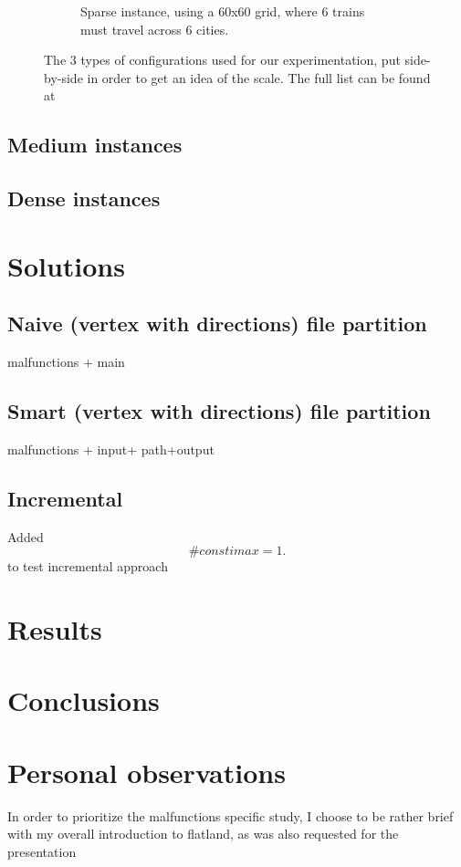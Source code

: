 \documentclass[runningheads]{llncs}
\begin{document}
\begin{figure}
\begin{minipage}{.49\textwidth}
\begin{subfigure}{\textwidth}
		\caption{Sparse instance, using a 60x60 grid, where 6 trains must travel across 6 cities.}
		\label{sparse_0_1}
				\end{subfigure}
	\end{minipage}
	\caption{The 3 types of configurations used for our experimentation, put side-by-side in order to get an idea of the scale. The full list can be found at \cite{instance_folder}}
	\label{sparse_medium_dense}
\end{figure}




\subsection{Medium instances}

\subsection{Dense instances}



\section{Solutions}


\subsection{Naive (vertex with directions) file partition}
malfunctions + main
\subsection{Smart (vertex with directions) file partition}
malfunctions + input+ path+output
\subsection{Incremental}

Added 
$$\#const imax = 1.$$ 
to test  incremental approach

\section{Results}


\section{Conclusions}

\section{Personal observations}
In order to prioritize the malfunctions specific study, I choose to be rather brief with my overall introduction to flatland, as was also requested for the presentation
\end{document}
